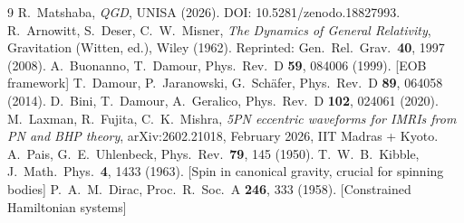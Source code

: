 \documentclass[11pt,a4paper]{article}
\theoremstyle{plain}
\theoremstyle{definition}
\theoremstyle{remark}
\begin{document}
\begin{thebibliography}{9}
R.~Matshaba, \textit{QGD}, UNISA (2026). DOI: 10.5281/zenodo.18827993.
R.~Arnowitt, S.~Deser, C.~W.~Misner,
  \textit{The Dynamics of General Relativity}, Gravitation (Witten, ed.), Wiley (1962).
  Reprinted: Gen.\ Rel.\ Grav.\ \textbf{40}, 1997 (2008).
A.~Buonanno, T.~Damour,
  Phys.\ Rev.\ D \textbf{59}, 084006 (1999). [EOB framework]
T.~Damour, P.~Jaranowski, G.~Sch\"afer,
  Phys.\ Rev.\ D \textbf{89}, 064058 (2014).
D.~Bini, T.~Damour, A.~Geralico,
  Phys.\ Rev.\ D \textbf{102}, 024061 (2020).
M.~Laxman, R.~Fujita, C.~K.~Mishra,
  \textit{5PN eccentric waveforms for IMRIs from PN and BHP theory},
  arXiv:2602.21018, February 2026, IIT Madras + Kyoto.
A.~Pais, G.~E.~Uhlenbeck,
  Phys.\ Rev.\ \textbf{79}, 145 (1950).
T.~W.~B.~Kibble, J.\ Math.\ Phys.\ \textbf{4}, 1433 (1963).
  [Spin in canonical gravity, crucial for spinning bodies]
P.~A.~M.~Dirac,
  Proc.\ R.\ Soc.\ A \textbf{246}, 333 (1958). [Constrained Hamiltonian systems]
\end{thebibliography}
\end{document}
